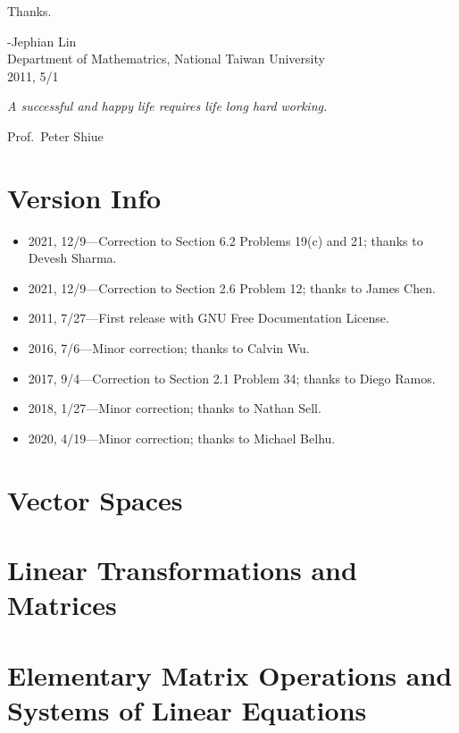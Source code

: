 \documentclass{report}
\theoremstyle{definition}
\begin{document}
Thanks.

\begin{flushright}
-Jephian Lin\\
Department of Mathematrics, National Taiwan University\\
2011, 5/1
\end{flushright}

\textit{A successful and happy life requires life long hard working.}
\begin{flushright}
Prof.~Peter Shiue
\end{flushright}

\chapter*{Version Info}
\begin{itemize}
\item 2021, 12/9---Correction to Section 6.2 Problems 19(c) and 21; thanks to Devesh Sharma.
\item 2021, 12/9---Correction to Section 2.6 Problem 12; thanks to James Chen.
\item 2011, 7/27---First release with GNU Free Documentation License.
\item 2016, 7/6---Minor correction; thanks to Calvin Wu.
\item 2017, 9/4---Correction to Section 2.1 Problem 34; thanks to Diego Ramos. 
\item 2018, 1/27---Minor correction; thanks to Nathan Sell.
\item 2020, 4/19---Minor correction; thanks to Michael Belhu.
\end{itemize}

\tableofcontents

\chapter{Vector Spaces}






 

\chapter{Linear Transformations and Matrices}








\chapter{Elementary Matrix Operations and Systems of Linear Equations}




\end{document}
